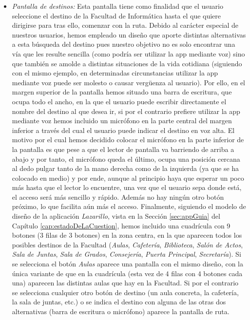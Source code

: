 \begin{itemize}
	\item \textit{Pantalla de destinos:} Esta pantalla tiene como finalidad que el usuario seleccione el destino de la Facultad de Informática hasta el que quiere dirigirse para tras ello, comenzar con la ruta. Debido al carácter especial de nuestros usuarios, hemos empleado un diseño que aporte distintas alternativas a esta búsqueda del destino pues nuestro objetivo no es solo encontrar una vía que les resulte sencilla (como podría ser utilizar la app mediante voz) sino que también se amolde a distintas situaciones de la vida cotidiana (siguiendo con el mismo ejemplo, en determinadas circunstancias utilizar la app mediante voz puede ser molesto o causar vergüenza al usuario). Por ello, en el margen superior de la pantalla hemos situado una barra de escritura, que ocupa todo el ancho, en la que el usuario puede escribir directamente el nombre del destino al que desea ir, si por el contrario prefiere utilizar la app mediante voz hemos incluido un micrófono en la parte central del margen inferior a través del cual el usuario puede indicar el destino en voz alta. El motivo por el cual hemos decidido colocar el micrófono en la parte inferior de la pantalla es que pese a que el lector de pantalla va barriendo de arriba a abajo y por tanto, el micrófono queda el último, ocupa una posición cercana al dedo pulgar tanto de la mano derecha como de la izquierda (ya que se ha colocado en medio) y por ende, aunque al principio haya que esperar un poco más hasta que el lector lo encuentre, una vez que el usuario sepa donde está, el acceso será más sencillo y rápido. Además no hay ningún otro botón próximo, lo que facilita aún más el acceso. Finalmente, siguiendo el modelo de diseño de la aplicación \textit{Lazarillo}, vista en la Sección \ref{sec:appGuia} del Capítulo \ref{cap:estadoDeLaCuestion}, hemos incluido una cuadrícula con 9 botones (3 filas de 3 botones) en la zona centra, en la que aparecen todos los posibles destinos de la Facultad (\textit{Aulas}, \textit{Cafetería}, \textit{Biblioteca}, \textit{Salón de Actos}, \textit{Sala de Juntas}, \textit{Sala de Grados}, \textit{Consejería},\textit{ Puerta Principal}, \textit{Secretaría}). Si se selecciona el botón \textit{Aulas} aparece una pantalla con el mismo diseño, con la única variante de que en la cuadrícula (esta vez de 4 filas con 4 botones cada una) aparecen las distintas aulas que hay en la Facultad. Si por el contrario se selecciona cualquier otro botón de destino (un aula concreta, la cafetería, la sala de juntas, etc.) o se indica el destino con alguna de las otras dos alternativas (barra de escritura o micrófono) aparece la pantalla de ruta.
	

\end{itemize}

